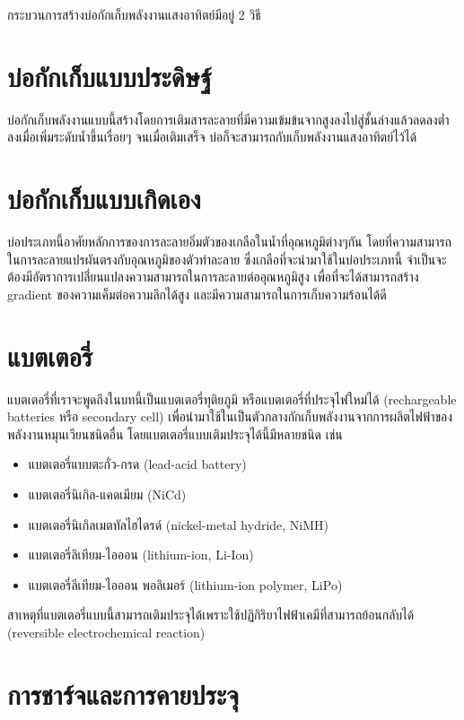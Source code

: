 \documentclass[a4paper,nobib,openany,10pt]{tufte-book}
\begin{document}
กระบวนการสร้างบ่อกักเก็บพลังงานแสงอาทิตย์มีอยู่ 2 วิธี

\section{บ่อกักเก็บแบบประดิษฐ์}
\label{sec:org4b0c7d9}
บ่อกักเก็บพลังงานแบบนี้สร้างโดยการเติมสารละลายที่มีความเข้มข้นจากสูงลงไปสู่ชั้นล่างแล้วลดลงต่ำลงเมื่อเพิ่มระดับน้ำขึ้นเรื่อยๆ
จนเมื่อเติมเสร็จ บ่อก็จะสามารถกับเก็บพลังงานแสงอาทิตย์ไว้ได้

\section{บ่อกักเก็บแบบเกิดเอง}
\label{sec:orgc3fa9f3}
บ่อประเภทนี้อาศัยหลักการของการละลายอิ่มตัวของเกลือในน้ำที่อุณหภูมิต่างๆกัน
โดยที่ความสามารถในการละลายแปรผันตรงกับอุณหภูมิของตัวทำละลาย
ซึ่งเกลือที่จะนำมาใช้ในบ่อประเภทนี้
จำเป็นจะต้องมีอัตราการเปลี่่ยนแปลงความสามารถในการละลายต่ออุณหภูมิสูง
เพื่อที่จะได้สามารถสร้าง gradient ของความเค็มต่อความลึกได้สูง
และมีความสามารถในการเก็บความร้อนได้ดี

\section{แบตเตอรี่}
\label{sec:org6f53816}

แบตเตอรี่ที่เราจะพูดถึงในบทนี้เป็นแบตเตอรี่ทุติยภูมิ หรือแบตเตอรี่ที่ประจุไฟใหม่ได้ (rechargeable batteries หรือ secondary cell) เพื่อนำมาใช้ในเป็นตัวกลางกักเก็บพลังงานจากการผลิตไฟฟ้าของพลังงานหมุนเวียนชนิดอื่น โดยแบตเตอรี่แบบเติมประจุได้นี้มีหลายชนิด เช่น

\begin{itemize}
\item แบตเตอรี่แบบตะกั่ว-กรด (lead-acid battery)
\item แบตเตอรี่นิเกิล-แคดเมียม (NiCd)
\item แบตเตอรี่นิเกิลเมตทัลไฮไดรด์ (nickel-metal hydride, NiMH)
\item แบตเตอรี่ลิเทียม-ไอออน (lithium-ion, Li-Ion)
\item แบตเตอรี่ลีเทียม-ไอออน พอลิเมอร์ (lithium-ion polymer, LiPo)
\end{itemize}

สาเหตุที่แบตเตอรี่แบบนี้สามารถเติมประจุได้เพราะใช้ปฏิกิริยาไฟฟ้าเคมีที่สามารถย้อนกลับได้ (reversible electrochemical reaction)

\section{การชาร์จและการคายประจุ}
\label{sec:orgfef0889}
\end{document}
